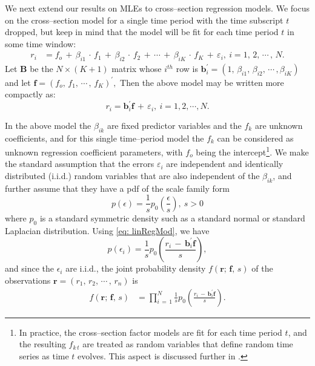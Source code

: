 \documentclass[graybox,envcountchap,sectrefs]{svmono}\usepackage[]{graphicx}\usepackage[]{xcolor}
\begin{document}
\begin{appendices}
We next extend our results on MLEs to cross--section regression models.
We focus on the cross--section model for a single time period with
the time subscript $t$ dropped, but keep in mind that the model will
be fit for each time period $t$ in some time window:
\begin{align}
r_{i} & =f_{o}\,+\,\beta_{i1}\,\cdot\,f_{1}\,+\,\beta_{i2}\,\cdot\,f_{2}\,+\,\cdots\,+\,\beta_{iK}\,\cdot\,f_{K}\,+\,\varepsilon_{i},\ i=1,\,2,\,\cdots\,,\,N.\label{eq: linRegModNoVectors}
\end{align}
Let $\mathbf{B}$ be the $N\times(K+1)$ matrix whose $i^{th}$ row
is $\mathbf{b}_{i}^{\prime}=(1,\,\beta_{i1},\,\beta_{i2},\,\cdots\,,\beta_{iK})$
and let $\mathbf{f}=(f_{o},\,f_{1},\,\cdots\,,\,f_{K})^{\prime},$
Then the above model may be written more compactly as:
\begin{equation}
r_{i}=\mathbf{b}_{i}^{\prime}\mathbf{f}\,+\,\varepsilon_{i},\ i=1,2,\cdots,N.\label{eq: linRegMod}
\end{equation}

In the above model the $\beta_{ik}$ are fixed predictor variables
and the $f_{k}$ are unknown coefficients, and for this single time--period
model the $f_{k}$ can be considered as unknown regression coefficient
parameters, with $f_{o}$ being the intercept\footnote{In practice, the cross--section factor models are fit for each time
period $t$, and the resulting $f_{k\,t}$ are treated as random variables
that define random time series as time $t$ evolves. This aspect is
discussed further in \CrossSectionalFactorModelsChapter.}. We make the standard assumption that the errors $\varepsilon_{i}$
are independent and identically distributed (i.i.d.) random variables
that are also independent of the $\beta_{ik}$, and further assume
that they have a pdf of the scale family form
\begin{equation}
p(\epsilon)=\frac{1}{s}p_{0}\left(\frac{\epsilon}{s}\right),\ s>0\label{eq: pdfScaledEpsilon}
\end{equation}
where $p_{0}$ is a standard symmetric density such as a standard
normal or standard Laplacian distribution. Using \eqref{eq: linRegMod},
we have
\begin{equation}
p(\epsilon_{i})=\frac{1}{s}p_{0}\left(\frac{r_{i}\,-\,\mathbf{b}_{i}^{\prime}\mathbf{f}}{s}\right),\label{eq: regObsPdf}
\end{equation}
and since the $\epsilon_{i}$ are i.i.d., the joint probability density
$f(\mathbf{r};\,\mathbf{f},\,s)$ of the observations $\mathbf{r}=(r_{1},\,r_{2},\,\cdots\,,\,r_{n})$
is 
\begin{align}
f(\mathbf{r};\,\mathbf{f},\,s) & =\prod_{i\,=\,1}^{N}\frac{1}{s}p_{0}\left(\frac{r_{i}\,-\,\mathbf{b}_{i}^{\prime}\mathbf{f}}{s}\right).\label{eq: regJointObsPdf}
\end{align}


\end{appendices}
\end{document}
